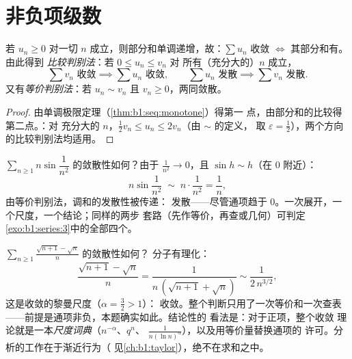 \section{非负项级数}

\begin{theorem}[部分和有界]\label{thm:b1:series:positive}
若 $u_n \geq 0$ 对一切 $n$ 成立，则部分和单调递增，故：$\sum
u_n$ 收敛 $\iff$ 其部分和有。由此得到
\emph{比较判别法}：若 $0 \leq u_n \leq v_n$ 对
所有（充分大的）$n$ 成立，
\[
\sum v_n \text{ 收敛} \implies \sum u_n \text{ 收敛},
\qquad
\sum u_n \text{ 发散} \implies \sum v_n \text{ 发散}.
\]
又有\emph{等价判别法}：若 $u_n \sim v_n$ 且 $v_n \geq
0$，两同敛散。
\end{theorem}

\begin{proof}
由单调极限定理（\cref{thm:b1:seq:monotone}）得第一
点，由部分和的比较得第二点。：对
充分大的 $n$，$\frac12 v_n \leq u_n \leq 2 v_n$（由 $\sim$ 的定义，
取 $\varepsilon = \frac12$），两个方向的比较判别法均适用。
\end{proof}

\begin{example}[用等价量证明发散]\label{ex:b1:series:equivdiverge}
$\sum_{n\geq1} n\sin\dfrac{1}{n^2}$ 的敛散性如何？由于
$\frac{1}{n^2} \to 0$，且 $\sin h \sim h$（在 $0$ 附近）：
\[
n\sin\frac{1}{n^2} \;\sim\; n\cdot\frac{1}{n^2} = \frac1n ,
\]
由等价判别法，调和的发散性被传递：
发散——尽管通项趋于
$0$。一次展开，一个尺度，一个结论；同样的两步
套路（先作等价，再查或几何）可判定
\cref{exo:b1:series:3}中的全部四个。
\end{example}

\begin{example}[一行内的等价判别法]\label{ex:b1:series:equivtest}
$\sum_{n \geq 1} \frac{\sqrt{n+1} - \sqrt n}{n}$ 的敛散性如何？
分子有理化：
\[
\frac{\sqrt{n+1} - \sqrt n}{n}
= \frac{1}{n\,(\sqrt{n+1} + \sqrt n)}
\sim \frac{1}{2\,n^{3/2}} ,
\]
这是收敛的黎曼尺度（$\alpha = \frac32 > 1$）：
收敛。整个判断只用了一次等价和一次查表
——前提是通项非负，本题确实如此。结论性的
看法是：对于正项，整个收敛
理论就是一本\emph{尺度词典}（$n^{-\alpha}$、$q^n$、
$\frac{1}{n(\ln n)^\alpha}$），以及用等价量替换通项的
许可。分析的工作在于渐近行为（
见\cref{ch:b1:taylor}），绝不在求和之中。
\end{example}

